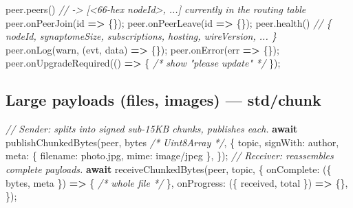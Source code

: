 \documentclass[
  nobib]{tufte-handout}
\newenvironment{Shaded}{}{}
\newcommand{\CommentTok}[1]{\textcolor[rgb]{0.38,0.63,0.69}{\textit{#1}}}
\newcommand{\ControlFlowTok}[1]{\textcolor[rgb]{0.00,0.44,0.13}{\textbf{#1}}}
\newcommand{\DataTypeTok}[1]{\textcolor[rgb]{0.56,0.13,0.00}{#1}}
\newcommand{\FunctionTok}[1]{\textcolor[rgb]{0.02,0.16,0.49}{#1}}
\newcommand{\KeywordTok}[1]{\textcolor[rgb]{0.00,0.44,0.13}{\textbf{#1}}}
\newcommand{\NormalTok}[1]{#1}
\newcommand{\OperatorTok}[1]{\textcolor[rgb]{0.40,0.40,0.40}{#1}}
\newcommand{\StringTok}[1]{\textcolor[rgb]{0.25,0.44,0.63}{#1}}
\begin{document}
\begin{Shaded}
\begin{Highlighting}[]
\NormalTok{peer}\OperatorTok{.}\FunctionTok{peers}\NormalTok{()                 }\CommentTok{// {-}\textgreater{} [\textquotesingle{}\textless{}66{-}hex nodeId\textgreater{}\textquotesingle{}, ...] currently in the routing table}
\NormalTok{peer}\OperatorTok{.}\FunctionTok{onPeerJoin}\NormalTok{(id }\KeywordTok{=\textgreater{}}\NormalTok{ \{\})}\OperatorTok{;}\NormalTok{   peer}\OperatorTok{.}\FunctionTok{onPeerLeave}\NormalTok{(id }\KeywordTok{=\textgreater{}}\NormalTok{ \{\})}\OperatorTok{;}
\NormalTok{peer}\OperatorTok{.}\FunctionTok{health}\NormalTok{()                }\CommentTok{// \{ nodeId, synaptomeSize, subscriptions, hosting, wireVersion, ... \}}
\NormalTok{peer}\OperatorTok{.}\FunctionTok{onLog}\NormalTok{(}\StringTok{\textquotesingle{}warn\textquotesingle{}}\OperatorTok{,}\NormalTok{ (evt}\OperatorTok{,}\NormalTok{ data) }\KeywordTok{=\textgreater{}}\NormalTok{ \{\})}\OperatorTok{;}\NormalTok{   peer}\OperatorTok{.}\FunctionTok{onError}\NormalTok{(err }\KeywordTok{=\textgreater{}}\NormalTok{ \{\})}\OperatorTok{;}
\NormalTok{peer}\OperatorTok{.}\FunctionTok{onUpgradeRequired}\NormalTok{(() }\KeywordTok{=\textgreater{}}\NormalTok{ \{ }\CommentTok{/* show "please update" */}\NormalTok{ \})}\OperatorTok{;}
\end{Highlighting}
\end{Shaded}

\subsection{Large payloads (files, images) ---
std/chunk}\label{large-payloads-files-images-stdchunk}

\begin{Shaded}
\begin{Highlighting}[]
\CommentTok{// Sender: splits into signed sub{-}15KB chunks, publishes each.}
\ControlFlowTok{await} \FunctionTok{publishChunkedBytes}\NormalTok{(peer}\OperatorTok{,}\NormalTok{ bytes }\CommentTok{/* Uint8Array */}\OperatorTok{,}\NormalTok{ \{}
\NormalTok{  topic}\OperatorTok{,} \DataTypeTok{signWith}\OperatorTok{:}\NormalTok{ author}\OperatorTok{,}
  \DataTypeTok{meta}\OperatorTok{:}\NormalTok{ \{ }\DataTypeTok{filename}\OperatorTok{:} \StringTok{\textquotesingle{}photo.jpg\textquotesingle{}}\OperatorTok{,} \DataTypeTok{mime}\OperatorTok{:} \StringTok{\textquotesingle{}image/jpeg\textquotesingle{}}\NormalTok{ \}}\OperatorTok{,}
\NormalTok{\})}\OperatorTok{;}
\CommentTok{// Receiver: reassembles complete payloads.}
\ControlFlowTok{await} \FunctionTok{receiveChunkedBytes}\NormalTok{(peer}\OperatorTok{,}\NormalTok{ topic}\OperatorTok{,}\NormalTok{ \{}
  \DataTypeTok{onComplete}\OperatorTok{:}\NormalTok{ (\{ bytes}\OperatorTok{,}\NormalTok{ meta \}) }\KeywordTok{=\textgreater{}}\NormalTok{ \{ }\CommentTok{/* whole file */}\NormalTok{ \}}\OperatorTok{,}
  \DataTypeTok{onProgress}\OperatorTok{:}\NormalTok{ (\{ received}\OperatorTok{,}\NormalTok{ total \}) }\KeywordTok{=\textgreater{}}\NormalTok{ \{\}}\OperatorTok{,}
\NormalTok{\})}\OperatorTok{;}
\end{Highlighting}
\end{Shaded}
\end{document}
